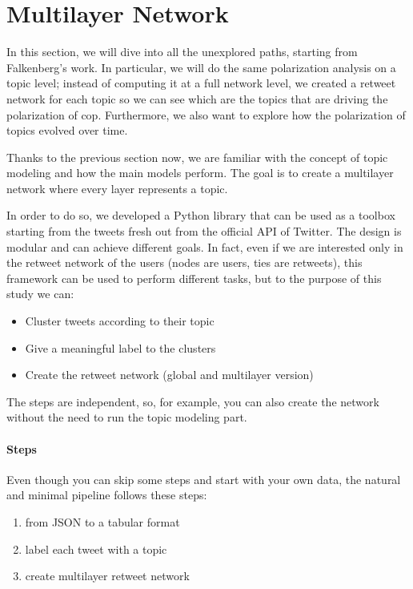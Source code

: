 
\section{Multilayer Network}

In this section, we will dive into all the unexplored paths, starting from Falkenberg's work. In particular, we will do the same polarization analysis on a topic level; instead of computing it at a full network level, we created a retweet network for each topic so we can see which are the topics that are driving the polarization of cop. Furthermore, we also want to explore how the polarization of topics evolved over time.

Thanks to the previous section now, we are familiar with the concept of topic modeling and how the main models perform. The goal is to create a multilayer network where every layer represents a topic. 

In order to do so, we developed a Python library that can be used as a toolbox starting from the tweets fresh out from the official API of Twitter. The design is modular and can achieve different goals.
In fact, even if we are interested only in the retweet network of the users (nodes are users, ties are retweets), this framework can be used to perform different tasks, but to the purpose of this study we can: 

\begin{itemize}
    \item Cluster tweets according to their topic
    \item Give a meaningful label to the clusters
    \item Create the retweet network (global and multilayer version)


\end{itemize}

The steps are independent, so, for example, you can also create the network without the need to run the topic modeling part.

\paragraph{Steps}
Even though you can skip some steps and start with your own data, the natural and minimal pipeline follows these steps:


\begin{enumerate}
    \item from JSON to a tabular format 
    \item label each tweet with a topic
    \item create multilayer retweet network  
    
\end{enumerate} 


